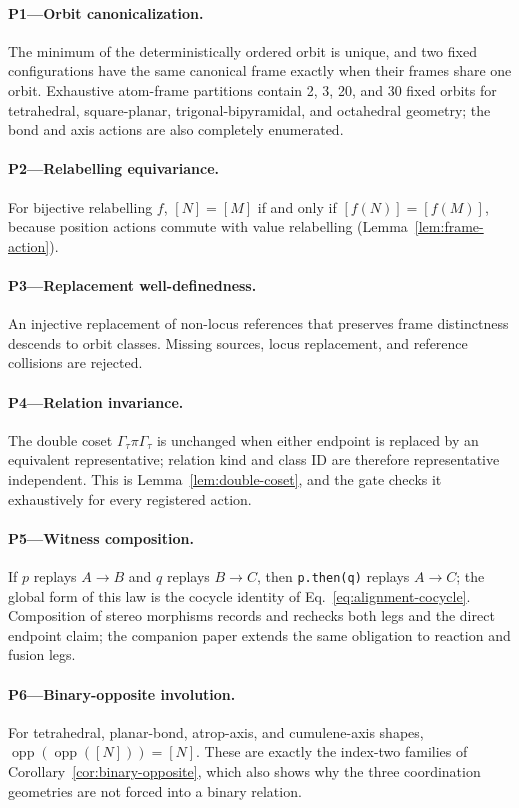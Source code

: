 \documentclass[pdflatex,sn-mathphys-num,referee,lineno]{sn-jnl}
\newcommand{\code}[1]{\texttt{#1}}
\theoremstyle{plain}
\theoremstyle{remark}
\theoremstyle{definition}
\begin{document}
\paragraph{P1---Orbit canonicalization.}
The minimum of the deterministically ordered orbit is unique, and two fixed
configurations have the same canonical frame exactly when their frames share
one orbit.  Exhaustive atom-frame partitions contain 2, 3, 20, and 30 fixed
orbits for tetrahedral, square-planar, trigonal-bipyramidal, and octahedral
geometry; the bond and axis actions are also completely enumerated.

\paragraph{P2---Relabelling equivariance.}
For bijective relabelling \(f\), \([N]=[M]\) if and only if
\([f(N)]=[f(M)]\), because position actions commute with value relabelling
(Lemma~\ref{lem:frame-action}).

\paragraph{P3---Replacement well-definedness.}
An injective replacement of non-locus references that preserves frame
distinctness descends to orbit classes.  Missing sources, locus replacement,
and reference collisions are rejected.

\paragraph{P4---Relation invariance.}
The double coset \(\Gamma_\tau\pi\Gamma_\tau\) is unchanged when either endpoint is replaced
by an equivalent representative; relation kind and class ID are therefore
representative independent.  This is Lemma~\ref{lem:double-coset}, and the
gate checks it exhaustively for every registered action.

\paragraph{P5---Witness composition.}
If \(p\) replays \(A\to B\) and \(q\) replays \(B\to C\), then
\code{p.then(q)} replays \(A\to C\); the global form of this law is the cocycle
identity of Eq.~\eqref{eq:alignment-cocycle}.  Composition of stereo morphisms records
and rechecks both legs and the direct endpoint claim; the companion paper
extends the same obligation to reaction and fusion legs.

\paragraph{P6---Binary-opposite involution.}
For tetrahedral, planar-bond, atrop-axis, and cumulene-axis shapes,
\(\operatorname{opp}(\operatorname{opp}([N]))=[N]\).  These are exactly the
index-two families of Corollary~\ref{cor:binary-opposite}, which also shows why
the three coordination geometries are not forced into a binary relation.
\end{document}
